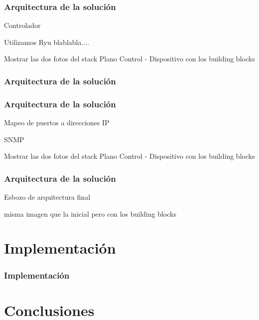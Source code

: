 \documentclass{beamer}
\begin{document}
\begin{frame}
\frametitle{Arquitectura de la soluci\'on} 

Controlador

Utilizamos Ryu blablabla....

Mostrar las dos fotos del stack Plano Control - Dispositivo con los building blocks
\end{frame}

\begin{frame}
\frametitle{Arquitectura de la soluci\'on} 




\end{frame}

\begin{frame}
\frametitle{Arquitectura de la soluci\'on} 

Mapeo de puertos a direcciones IP

SNMP

Mostrar las dos fotos del stack Plano Control - Dispositivo con los building blocks
\end{frame}

\begin{frame}
\frametitle{Arquitectura de la soluci\'on} 

Esbozo de arquitectura final

misma imagen que la inicial pero con los building blocks
\end{frame}


\section{Implementaci\'on} 

\begin{frame}
\frametitle{Implementaci\'on} 

\end{frame}

\section{Conclusiones} 
\end{document}
